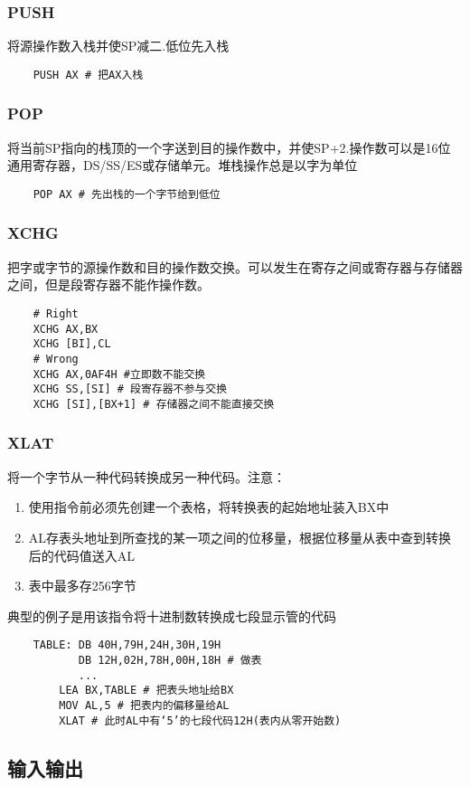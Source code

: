 \subsubsection{PUSH}
将源操作数入栈并使SP减二.{\color{red}低位先入栈}
\begin{lstlisting}
    PUSH AX # 把AX入栈
\end{lstlisting}
\subsubsection{POP}
将当前SP指向的栈顶的一个字送到目的操作数中，并使SP+2.操作数可以是16位通用寄存器，DS/SS/ES或存储单元。{\color{red}堆栈操作总是以字为单位}
\begin{lstlisting}
    POP AX # 先出栈的一个字节给到低位
\end{lstlisting}
\subsubsection{XCHG}
把字或字节的源操作数和目的操作数交换。可以发生在寄存之间或寄存器与存储器之间，但是段寄存器不能作操作数。
\begin{lstlisting}
    # Right
    XCHG AX,BX
    XCHG [BI],CL 
    # Wrong
    XCHG AX,0AF4H #立即数不能交换
    XCHG SS,[SI] # 段寄存器不参与交换
    XCHG [SI],[BX+1] # 存储器之间不能直接交换
\end{lstlisting}
\subsubsection{XLAT}
将一个字节从一种代码转换成另一种代码。注意：
\begin{enumerate}
    \item 使用指令前必须先创建一个表格，将转换表的起始地址装入BX中
    \item AL存表头地址到所查找的某一项之间的位移量，根据位移量从表中查到转换后的代码值送入AL
    \item 表中最多存256字节
\end{enumerate}
典型的例子是用该指令将十进制数转换成七段显示管的代码
\begin{lstlisting}
    TABLE: DB 40H,79H,24H,30H,19H
           DB 12H,02H,78H,00H,18H # 做表
           ... 
        LEA BX,TABLE # 把表头地址给BX
        MOV AL,5 # 把表内的偏移量给AL
        XLAT # 此时AL中有‘5’的七段代码12H(表内从零开始数)
\end{lstlisting}
\subsection{输入输出}
